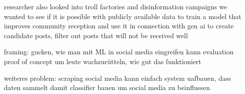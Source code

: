 researcher also looked into troll factories and disinformation campaigns \cite{linvill2020troll}
we wanted to see if it is possible with publicly available data to train a model that improves community reception and use it in connection with gen ai to create candidate posts, filter out posts that will not be received well 


framing: gucken, wie man mit ML in social media eingreifen kann
evaluation proof of concept um leute wachzurütteln, wie gut das funktioniert

weiteres problem: scraping social media 
kann einfach system uafbauen, dass daten sammelt
damit classifier bauen um social media zu beinflussen
